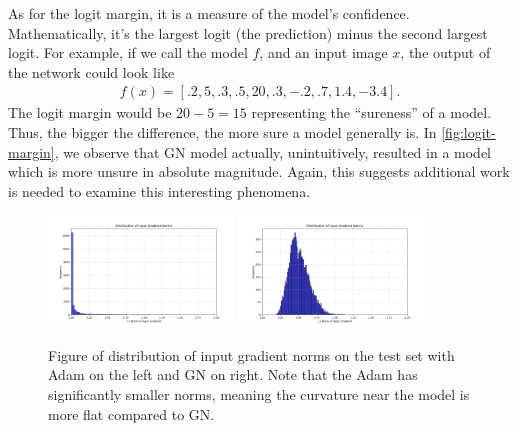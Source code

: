 \documentclass{article}
\begin{document}
    As for the logit margin, it is a measure of the model's confidence.
    Mathematically, it's the largest logit (the prediction) minus the second largest logit.
    For example, if we call the model $f$, and an input image $x$, the output of the network could look like
    \begin{align*}
        f(x) = [.2, 5, .3, .5, 20, .3, -.2, .7, 1.4, -3.4].
    \end{align*}
    The logit margin would be $20 - 5 = 15$ representing the ``sureness'' of a model.
    Thus, the bigger the difference, the more sure a model generally is.
    In \cref{fig:logit-margin}, we observe that GN model actually, unintuitively, resulted in a model which is more unsure in absolute magnitude.
    Again, this suggests additional work is needed to examine this interesting phenomena.

    \begin{figure}[ht]
        \centering
        \includegraphics[width=0.44\textwidth]{../src/outputs/2025-09-10/23-05-38/input_gradient_norm_distribution.png}
        \includegraphics[width=0.44\textwidth]{../src/outputs/2025-09-10/23-05-59/input_gradient_norm_distribution.png}
        \caption{Figure of distribution of input gradient norms on the test set with Adam on the left and GN on right.
        Note that the Adam has significantly smaller norms, meaning the curvature near the model is more flat compared to GN.}
        \label{fig:grad-norm}
    \end{figure}
\end{document}
